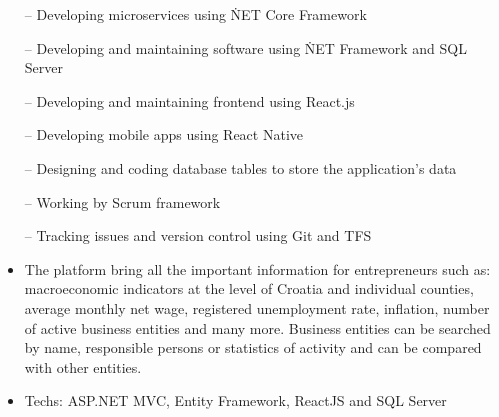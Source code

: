 \documentclass[12pt,a4paper]{altacv}
\begin{document}


\begin{itemize}
    \setlength{\itemindent}{0.5em}
    \item[--]   \small{Developing microservices using \.NET Core Framework}
    \item[--]   \small{Developing and maintaining software using \.NET Framework and SQL Server}
    \item[--]   \small{Developing and maintaining frontend using React.js}
    \item[--]   \small{Developing mobile apps using React Native}
    \item[--]   \small{Designing and coding database tables to store the application’s data}
    \item[--]   \small{Working by Scrum framework}
    \item[--]   \small{Tracking issues and version control using Git and TFS}
\end{itemize}

\medskip





\begin{itemize}
  \item \small{The platform bring all the important information for entrepreneurs such as: macroeconomic indicators at the level of Croatia and individual counties, average monthly net wage, registered unemployment rate, inflation, number of active business entities and many more. Business entities can be searched by name, responsible persons or statistics of activity and can be compared with other entities.}
  \item Techs: ASP.NET MVC, Entity Framework, ReactJS and SQL Server
\end{itemize}

\divider

%
\end{document}
